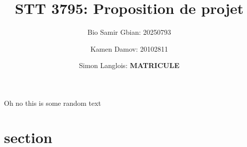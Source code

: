 \documentclass{article}
\title{STT 3795: Proposition de projet}
\author{Bio Samir Gbian: 20250793}
\author{Kamen Damov: 20102811}
\author{Simon Langlois: \textbf{MATRICULE}}
\affil{Département de mathématiques et statistiques}
\affil{Université de Montréal}
\begin{document}
\maketitle
Oh no this is some random text
\section{section}
\end{document}
